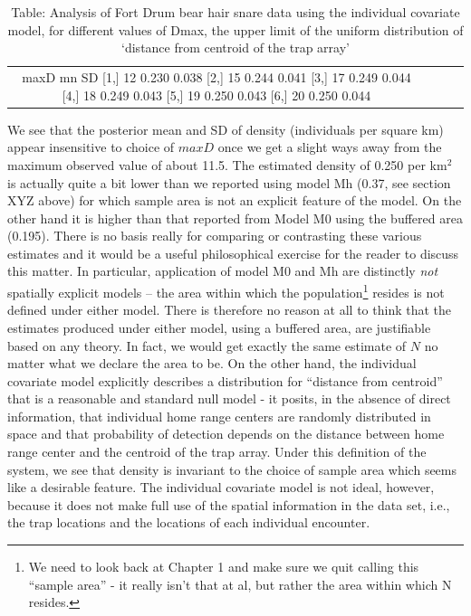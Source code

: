 \begin{table}
\caption{Table: Analysis of Fort Drum bear hair snare data using the individual covariate model, for different values of Dmax, the upper limit of the uniform distribution of `distance from centroid of the trap array' }
\begin{tabular}{cccc}
     maxD   mn    SD
[1,]  12 0.230 0.038
[2,]  15 0.244 0.041
[3,]  17 0.249 0.044
[4,]  18 0.249 0.043
[5,]  19 0.250 0.043
[6,]  20 0.250 0.044
\end{tabular}
\end{table}


We see that the posterior mean and SD of density (individuals per square km) appear insensitive to choice of $maxD$ once we get a slight ways away from the maximum observed value of about 11.5. The estimated density of 0.250 per km$^2$ is actually quite a bit lower than we reported using model Mh (0.37, see section XYZ above) for which sample area is not an explicit feature of the model. On the other hand it is higher than that reported from Model M0 using the buffered area (0.195). There is no basis really for comparing or contrasting these various estimates and it would be a useful philosophical exercise for the reader to discuss this matter. In particular, application of model M0 and Mh are distinctly {\it not} spatially explicit models -- the area within which the population\footnote{We need to look back at Chapter 1 and make sure we quit calling this ``sample area'' - it really isn't that at al, but rather the area within which N resides.} resides is not defined under either model. There is therefore no reason at all to think that the estimates produced under either model, using a buffered area, are justifiable based on any theory. In fact, we would get exactly the same estimate of $N$ no matter what we declare the area to be. On the other hand, the individual covariate model explicitly describes a distribution for ``distance from centroid'' that is a reasonable and standard null model - it posits, in the absence of direct information, that individual home range centers are randomly distributed in space and that probability of detection depends on the distance between home range center and the centroid of the trap array. Under this definition of the system, we see that density is invariant to the choice of sample area which seems like a desirable feature. The individual covariate model is not ideal, however, because it does not make full use of the spatial information in the data set, i.e., the trap locations and the locations of each individual encounter.


